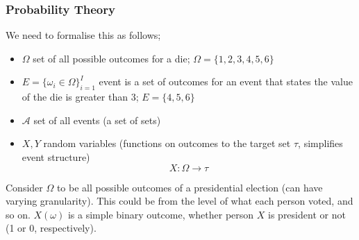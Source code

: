 \documentclass[a4paper, 12pt]{article}
\begin{document}
            \subsubsection*{Probability Theory}
                We need to formalise this as follows;
                \begin{itemize}
                    \itemsep0em
                    \item $\Omega$ \hfill set of all possible outcomes
                        \subitem for a die; $\Omega = \{1, 2, 3, 4, 5, 6\}$
                    \item $E = \{\omega_i \in \Omega\}_{i = 1}^I$ \hfill event is a set of outcomes
                        \subitem for an event that states the value of the die is greater than 3; $E = \{4, 5, 6\}$
                    \item $\mathcal{A}$ \hfill set of all events (a set of sets)
                    \item $X, Y$ \hfill random variables (functions on outcomes to the target set $\tau$, simplifies event structure)
                        $$X: \Omega \to \tau$$
                \end{itemize}
                Consider $\Omega$ to be all possible outcomes of a presidential election (can have varying granularity).
                This could be from the level of what each person voted, and so on.
                $X(\omega)$ is a simple binary outcome, whether person $X$ is president or not (1 or 0, respectively).
                \medskip
\end{document}

